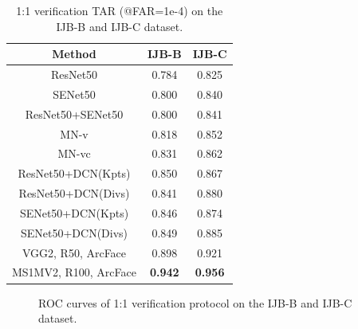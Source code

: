 \documentclass[10pt,twocolumn,letterpaper]{article}
\begin{document}
\begin{table}[t!]
\begin{center}
\begin{tabular}{c|c|c}
\hline
Method           & IJB-B & IJB-C  \\ 
\hline
ResNet50 \cite{cao2017vggface2} &0.784 & 0.825\\
SENet50 \cite{cao2017vggface2}  &0.800 & 0.840\\
ResNet50+SENet50 \cite{cao2017vggface2}&0.800& 0.841\\
MN-v \cite{xie2018multicolumn}&0.818 & 0.852\\
MN-vc \cite{xie2018multicolumn}&0.831 & 0.862\\
ResNet50+DCN(Kpts) \cite{xie2018comparator}&0.850 & 0.867\\
ResNet50+DCN(Divs) \cite{xie2018comparator}&0.841 & 0.880\\
SENet50+DCN(Kpts)  \cite{xie2018comparator}&0.846 & 0.874\\
SENet50+DCN(Divs)  \cite{xie2018comparator}&0.849 & 0.885\\
\hline
VGG2, R50, ArcFace    & 0.898 & 0.921\\
MS1MV2, R100, ArcFace & {\bf 0.942} & {\bf 0.956}\\
\hline
\end{tabular}
\end{center}
\vspace{-2mm}
\caption{1:1 verification TAR (@FAR=1e-4) on the IJB-B and IJB-C dataset.}
\vspace{-4mm}
\label{tab:ijb}
\end{table}

\begin{figure}[h!]
\centering
{}
\caption{ROC curves of 1:1 verification protocol on the IJB-B and IJB-C dataset.}
\vspace{-2mm}
\label{pic:ijb}
\end{figure}
\end{document}
